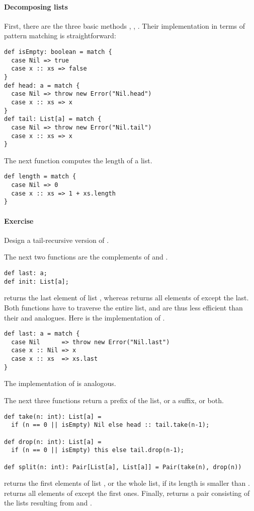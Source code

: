 \documentclass[a4paper,12pt,twoside,titlepage]{book}
\newcommand{\exercise}{\paragraph{Exercise}}
\begin{document}
\paragraph{Decomposing lists}
First, there are the three basic methods ,
, . Their implementation in terms of pattern
matching is straightforward:
\begin{lstlisting}
def isEmpty: boolean = match {
  case Nil => true
  case x :: xs => false 
}   
def head: a = match { 
  case Nil => throw new Error("Nil.head") 
  case x :: xs => x 
}
def tail: List[a] = match { 
  case Nil => throw new Error("Nil.tail") 
  case x :: xs => x 
}
\end{lstlisting}

The next function computes the length of a list.
\begin{lstlisting}
def length = match {
  case Nil => 0
  case x :: xs => 1 + xs.length
}
\end{lstlisting}
\exercise Design a tail-recursive version of .

The next two functions are the complements of  and
.
\begin{lstlisting}
def last: a;
def init: List[a];
\end{lstlisting}
 returns the last element of list , whereas
 returns all elements of  except the last.
Both functions have to traverse the entire list, and are thus less
efficient than their  and  analogues.
Here is the implementation of .
\begin{lstlisting}
def last: a = match {
  case Nil      => throw new Error("Nil.last")
  case x :: Nil => x
  case x :: xs  => xs.last
}
\end{lstlisting}
The implementation of  is analogous.

The next three functions return a prefix of the list, or a suffix, or
both.
\begin{lstlisting}
def take(n: int): List[a] = 
  if (n == 0 || isEmpty) Nil else head :: tail.take(n-1);

def drop(n: int): List[a] = 
  if (n == 0 || isEmpty) this else tail.drop(n-1);

def split(n: int): Pair[List[a], List[a]] = Pair(take(n), drop(n))
\end{lstlisting}
 returns the first  elements of list
, or the whole list, if its length is smaller than .
 returns all elements of  except the
 first ones. Finally,  returns a pair
consisting of the lists resulting from  and
.
\end{document}
